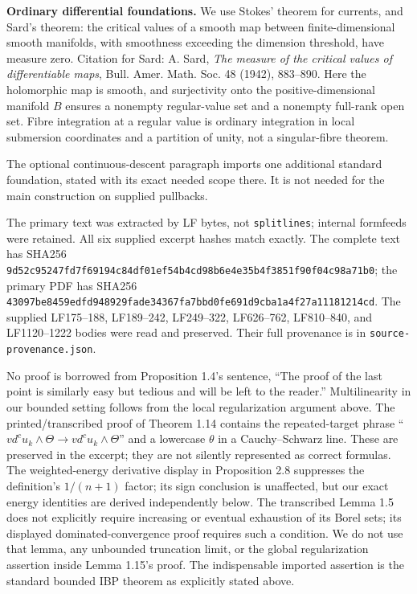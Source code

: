 \documentclass[
  11pt,
]{article}
\begin{document}
\textbf{Ordinary differential foundations.} We use Stokes' theorem for
currents, and Sard's theorem: the critical values of a smooth map
between finite-dimensional smooth manifolds, with smoothness exceeding
the dimension threshold, have measure zero. Citation for Sard: A. Sard,
\emph{The measure of the critical values of differentiable maps}, Bull.
Amer. Math. Soc. 48 (1942), 883--890. Here the holomorphic map is
smooth, and surjectivity onto the positive-dimensional manifold \(B\)
ensures a nonempty regular-value set and a nonempty full-rank open set.
Fibre integration at a regular value is ordinary integration in local
submersion coordinates and a partition of unity, not a singular-fibre
theorem.

The optional continuous-descent paragraph imports one additional
standard foundation, stated with its exact needed scope there. It is not
needed for the main construction on supplied pullbacks.

The primary text was extracted by LF bytes, not \texttt{splitlines};
internal formfeeds were retained. All six supplied excerpt hashes match
exactly. The complete text has SHA256
\texttt{9d52c95247fd7f69194c84df01ef54b4cd98b6e4e35b4f3851f90f04c98a71b0};
the primary PDF has SHA256
\texttt{43097be8459edfd948929fade34367fa7bbd0fe691d9cba1a4f27a11181214cd}.
The supplied LF175--188, LF189--242, LF249--322, LF626--762, LF810--840,
and LF1120--1222 bodies were read and preserved. Their full provenance
is in \texttt{source-provenance.json}.

No proof is borrowed from Proposition 1.4's sentence, ``The proof of the
last point is similarly easy but tedious and will be left to the
reader.'' Multilinearity in our bounded setting follows from the local
regularization argument above. The printed/transcribed proof of Theorem
1.14 contains the repeated-target phrase
``\(v d^c u_k\wedge\Theta\to v d^c u_k\wedge\Theta\)'' and a lowercase
\(\theta\) in a Cauchy--Schwarz line. These are preserved in the
excerpt; they are not silently represented as correct formulas. The
weighted-energy derivative display in Proposition 2.8 suppresses the
definition's \(1/(n+1)\) factor; its sign conclusion is unaffected, but
our exact energy identities are derived independently below. The
transcribed Lemma 1.5 does not explicitly require increasing or eventual
exhaustion of its Borel sets; its displayed dominated-convergence proof
requires such a condition. We do not use that lemma, any unbounded
truncation limit, or the global regularization assertion inside Lemma
1.15's proof. The indispensable imported assertion is the standard
bounded IBP theorem as explicitly stated above.
\end{document}
